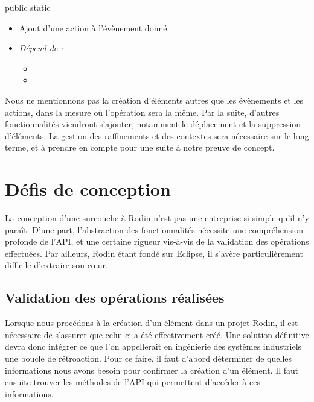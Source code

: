 \begin{labeling}{public static}
    \item [\javacode{public static}] 
        \begin{itemize}[label={}]
            \item Ajout d'une action à l'évènement donné.
            \item \textit{Dépend de :}
                \begin{itemize}
                    \item {}
                    \item {}
                \end{itemize}
        \end{itemize}

\end{labeling}

Nous ne mentionnons pas la création d'éléments autres que les évènements et les actions, dans la mesure où l'opération sera la même.
Par la suite, d'autres fonctionnalités viendront s'ajouter, notamment le déplacement et la suppression d'éléments.
La gestion des raffinements et des contextes sera nécessaire sur le long terme, et à prendre en compte pour une suite à notre preuve de concept.


\section{Défis de conception}

La conception d'une surcouche à Rodin n'est pas une entreprise si simple qu'il n'y paraît.
D'une part, l'abstraction des fonctionnalités nécessite une compréhension profonde de l'API, et une certaine rigueur vis-à-vis de la validation %
des opérations effectuées.
Par ailleurs, Rodin étant fondé sur Eclipse, il s'avère particulièrement difficile d'extraire son cœur.


\subsection{Validation des opérations réalisées}

Lorsque nous procédons à la création d'un élément dans un projet Rodin, il est nécessaire de s'assurer que celui-ci a été effectivement créé.
Une solution définitive devra donc intégrer ce que l'on appellerait en ingénierie des systèmes industriels une boucle de rétroaction.
Pour ce faire, il faut d'abord déterminer de quelles informations nous avons besoin pour confirmer la création d'un élément.
Il faut ensuite trouver les méthodes de l'API qui permettent d'accéder à ces informations.

